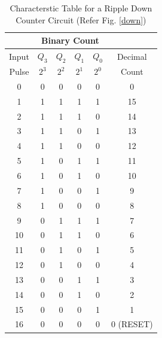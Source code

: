 \begin{enumerate}
\begin{table}[H]
    \centering
    \begin{tabular}{|c|c|c|c|c|c|}\hline
          & \multicolumn{4}{c|}{Binary Count} &         \\ \hline
    Input & $Q_3$  & $Q_2$  & $Q_1$  & $Q_0$  & Decimal \\
    Pulse & $2^3$  & $2^2$  & $2^1$  & $2^0$  & Count   \\ \hline
    0     & 0      & 0      & 0      & 0     & 0       \\
    1    & 1      & 1      & 1      & 1     & 15      \\
    2    & 1      & 1      & 1      & 0     & 14       \\
    3    & 1      & 1      & 0      & 1     & 13       \\
    4    & 1      & 1      & 0      & 0     & 12       \\
    5    & 1      & 0      & 1      & 1     & 11       \\
    6    & 1      & 0      & 1      & 0     & 10       \\
    7     & 1      & 0      & 0      & 1     & 9       \\
    8     & 1      & 0      & 0      & 0     & 8       \\
    9     & 0      & 1      & 1      & 1     & 7       \\
    10     & 0      & 1      & 1      & 0     & 6       \\
    11     & 0      & 1      & 0      & 1     & 5       \\
    12     & 0      & 1      & 0      & 0     & 4       \\
    13     & 0      & 0      & 1      & 1     & 3       \\
    14     & 0      & 0      & 1      & 0     & 2       \\
    15     & 0      & 0      & 0      & 1     & 1       \\
    16    & 0      & 0      & 0      & 0     & 0 (RESET)    \\ \hline
    \end{tabular}
    \caption{Characterstic Table for a Ripple Down Counter Circuit (Refer Fig. \ref{down})}
\end{table}
\end{enumerate}
